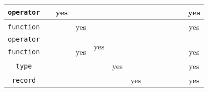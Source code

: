 \begin{center}
{\begin{tabular}{|c||c|c|c|c|c|c|c|c|c|c|c|c|}
    \hline
    \lstinline!operator!          &                          & yes                       &                                            &                      &                          &                          &                          &                          &                            &                          &                        & \cellcolor{lightgray}yes                   \\
    \hline
    \lstinline!function!          &                          &                           & yes                                        &                      &                          &                          &                          &                          &                            &                          &                        & \cellcolor{lightgray}yes                   \\
    \hline
    \lstinline!operator!          &                          &                           & \cellcolor{lightgray}                      & \multirow{2}{*}{yes} &                          &                          &                          &                          &                            &                          &                        & \cellcolor{lightgray}                      \\
    \lstinline!function!          &                          &                           & \multirow{-2}{*}{\cellcolor{lightgray}yes} &                      &                          &                          &                          &                          &                            &                          &                        & \multirow{-2}{*}{\cellcolor{lightgray}yes}  \\
    \hline
    \lstinline!type!              &                          &                           &                                            &                      & yes                      &                          &                          &                          &                            &                          &                        & \cellcolor{lightgray}yes                   \\
    \hline
    \lstinline!record!            &                          &                           &                                            &                      &                          & yes                      &                          &                          &                            &                          &                        & \cellcolor{lightgray}yes                   \\

\end{tabular}}
\end{center}
